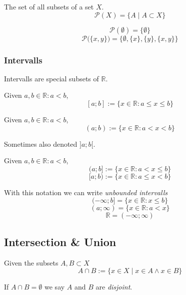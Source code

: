 \begin{definition}[Powerset]
   The set of all subsets of a set \(X\).
   \[\mathcal{P}(X) = \{A \mid A \subset X\}\]
\end{definition}
\begin{example}
   \[\mathcal{P}(\emptyset) = \{\emptyset\}\]
   \[\mathcal{P}\big(\{x, y\}\big) = \big\{\emptyset, \{x\}, \{y\}, \{x, y\}\big\}\]
\end{example}

\subsubsection{Intervalls}
Intervalls are special subsets of \(\mathbb{R}\).

\begin{definition}
   Given \(a, b \in \mathbb{R}: a < b\),
   \[[a; b] := \{x \in \mathbb{R}: a \leq x \leq b\}\]
\end{definition}

\begin{definition}
   Given \(a, b \in \mathbb{R}: a < b\),
   \[(a; b) := \{x \in \mathbb{R}: a < x < b\}\]
\end{definition}
\begin{remark}[Notation]
   Sometimes also denoted \(]a;b[\).
\end{remark}

\begin{definition}
   Given \(a, b \in \mathbb{R}: a < b\),
   \[(a; b] := \{x \in \mathbb{R}: a < x \leq b\}\]
   \[[a; b) := \{x \in \mathbb{R}: a \leq x < b\}\]
\end{definition}
\begin{remark}[Intuition]
   With this notation we can write \emph{unbounded intervalls}
   \[(-\infty; b] = \{x \in \mathbb{R}: x \leq b\}\]
   \[(a; \infty) = \{x \in \mathbb{R}: a < x\}\]
   \[\mathbb{R} = (-\infty; \infty)\]
\end{remark}

\subsection{Intersection \& Union}
\begin{definition}[Intersection]
   Given the subsets \(A, B \subset X\)
   \[A \cap B := \{x \in X \mid x \in A \land x \in B\}\]
\end{definition}
\begin{remark}
   If \(A \cap B = \emptyset\) we say \(A\) and \(B\) are \textit{disjoint}.
\end{remark}

